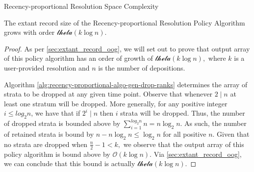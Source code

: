 \begin{theorem}{Recency-proportional Resolution Space Complexity}
\label{thm:recency-proportional-resolution-algo-space-complexity}

The \gls{extant record size} of the Recency-proportional Resolution Policy Algorithm grows with order $\mathcal{theta}{(k \log{n})}.$

\end{theorem}

\begin{proof}
\label{prf:recency-proportional-resolution-algo-space-complexity}
As per \ref{sec:extant_record_oog}, we will set out to prove that output array of this policy algorithm has an order of growth of $\mathcal{theta}{(k \log{n})},$ where $k$ is a user-provided resolution and $n$ is the number of depositions.

Algorithm \ref{alg:recency-proportional-algo-gen-drop-ranks} determines the array of strata to be dropped at any given time point.
Observe that whenever $2 \mid n$ at least one stratum will be dropped.
More generally, for any positive integer $i \le log_2{n}$, we have that if $2^i \mid n$ then $i$ strata will be dropped. 
Thus, the number of dropped strata is bounded above by $\sum_{i=1}^{log_2{n}} n = n \log_2{n}.$
As such, the number of retained strata is bound by $n - n \log_2{n} \le \log_2{n}$ for all positive $n.$
Given that no strata are dropped when $\frac{n}{2} - 1 < k,$ we observe that the output array of this policy algorithm is bound above by $\mathcal{O}{(k \log{n})}.$
Via \ref{sec:extant_record_oog}, we can conclude that this bound is actually $\mathcal{theta}{(k \log{n})}.$
\end{proof}
